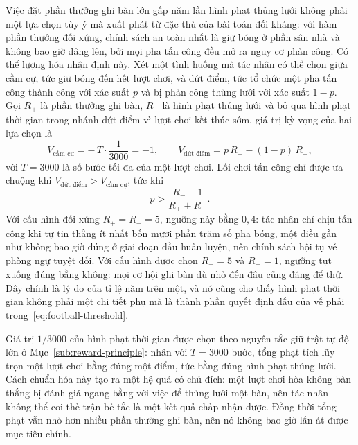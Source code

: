 \indent Việc đặt phần thưởng ghi bàn lớn gấp năm lần hình phạt thủng lưới không phải
một lựa chọn tùy ý mà xuất phát từ đặc thù của bài toán đối kháng: với hàm phần thưởng
đối xứng, chính sách an toàn nhất là giữ bóng ở phần sân nhà và không bao giờ dâng lên,
bởi mọi pha tấn công đều mở ra nguy cơ phản công. Có thể lượng hóa nhận định này. Xét
một tình huống mà tác nhân có thể chọn giữa cầm cự, tức giữ bóng đến hết lượt
chơi, và dứt điểm, tức tổ chức một pha tấn công thành công với xác suất $p$ và
bị phản công thủng lưới với xác suất $1 - p$. Gọi $R_{+}$ là phần thưởng ghi bàn,
$R_{-}$ là hình phạt thủng lưới và bỏ qua hình phạt thời gian trong nhánh dứt điểm vì
lượt chơi kết thúc sớm, giá trị kỳ vọng của hai lựa chọn là
\begin{equation}
V_{\text{cầm cự}} = -\,T \cdot \frac{1}{3000} = -1 ,
\qquad
V_{\text{dứt điểm}} = p\,R_{+} - (1-p)\,R_{-} ,
\label{eq:football-tradeoff}
\end{equation}
với $T = 3000$ là số bước tối đa của một lượt chơi. Lối chơi tấn công chỉ được ưa
chuộng khi $V_{\text{dứt điểm}} > V_{\text{cầm cự}}$, tức khi
\begin{equation}
p > \frac{R_{-} - 1}{R_{+} + R_{-}} .
\label{eq:football-threshold}
\end{equation}
Với cấu hình đối xứng $R_{+} = R_{-} = 5$, ngưỡng này bằng $0{,}4$: tác nhân chỉ chịu
tấn công khi tự tin thắng ít nhất bốn mươi phần trăm số pha bóng, một điều gần như
không bao giờ đúng ở giai đoạn đầu huấn luyện, nên chính sách hội tụ về phòng ngự tuyệt
đối. Với cấu hình được chọn $R_{+} = 5$ và $R_{-} = 1$, ngưỡng tụt xuống đúng bằng
không: mọi cơ hội ghi bàn dù nhỏ đến đâu cũng đáng để thử. Đây chính là lý do của tỉ lệ
năm trên một, và nó cũng cho thấy hình phạt thời gian không phải một chi tiết phụ mà là
thành phần quyết định dấu của vế phải trong~\eqref{eq:football-threshold}.

\indent Giá trị $1/3000$ của hình phạt thời gian được chọn theo nguyên tắc giữ trật tự
độ lớn ở Mục~\ref{sub:reward-principle}: nhân với $T = 3000$ bước, tổng phạt tích lũy
trọn một lượt chơi bằng đúng một điểm, tức bằng đúng hình phạt thủng lưới. Cách chuẩn
hóa này tạo ra một hệ quả có chủ đích: một lượt chơi hòa không bàn thắng bị đánh giá
ngang bằng với việc để thủng lưới một bàn, nên tác nhân không thể coi thế trận bế tắc là
một kết quả chấp nhận được. Đồng thời tổng phạt vẫn nhỏ hơn nhiều phần thưởng ghi bàn,
nên nó không bao giờ lấn át được mục tiêu chính.

